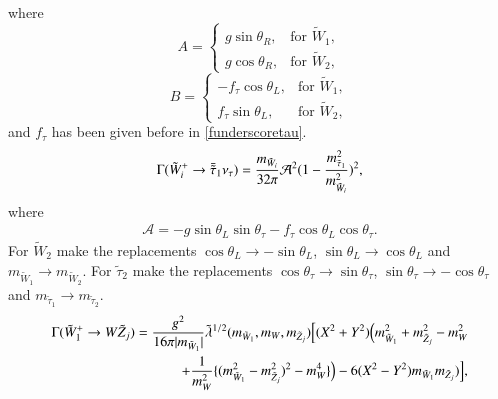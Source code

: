 \documentclass[final,3p,times,pdflatex]{elsarticle}
\begin{document}
where
\begin{equation}
  A=\begin{cases}
    g \sin\theta_{R}, & \text{for $\tilde{W}_1$},\\
    g \cos\theta_{R}, & \text{for $\tilde{W}_2$},
  \end{cases}
\end{equation}
\begin{equation}
  B=\begin{cases}
    -f_{\tau} \cos\theta_{L}, & \text{for $\tilde{W}_1$},\\
    f_{\tau}  \sin\theta_{L}, & \text{for $\tilde{W}_2$},
  \end{cases}
\end{equation}
and $f_\tau$ has been given before in \eqref{funderscoretau}.
\begin{equation}\label{chstau1nutau}
\begin{aligned}
\Gamma (\tilde{W}_i^+ \rightarrow \bar{\tilde{\tau}}_1 \nu_{\tau}) = {m_{\tilde{W}_i} \over 32\pi} \mathcal{A}^2 ( 1 - {m_{\tilde{\tau}_{1}}^2 \over m_{\tilde{W}_{i}}^2})^2 ,
\end{aligned}
\end{equation} 
where
\begin{equation}
\begin{aligned}
\mathcal{A} = -g\sin\theta_L\sin\theta_\tau - f_\tau \cos\theta_L\cos\theta_\tau.
\end{aligned}
\end{equation}
For $\tilde{W}_2$ make the replacements $\cos\theta_L \rightarrow -\sin\theta_L$, $\sin\theta_L \rightarrow \cos\theta_L$ and $m_{\tilde{W}_1} \rightarrow m_{\tilde{W}_2}$.
For $\tilde{\tau}_2$ make the replacements $\cos\theta_\tau \rightarrow \sin\theta_\tau$, $\sin\theta_\tau \rightarrow -\cos\theta_\tau$ and $m_{\tilde{\tau}_1} \rightarrow m_{\tilde{\tau}_2}$.
\begin{equation}\label{ch1Wneut}
\begin{aligned}
\Gamma (\tilde{W}_1^+ \rightarrow W \tilde{Z}_j) = {g^2 \over 16\pi|m_{\tilde{W}_1}| } \tilde{\lambda}^{1/2} (m_{\tilde{W}_1}, m_W, m_{\tilde{Z}_j}) \Big[(X^2 + Y^2)\Big(m_{\tilde{W}_1}^2 + m_{\tilde{Z}_j}^2 - m_{W}^2  \\ +{1 \over m_{W}^2}\{(m_{\tilde{W}_{1}}^2 - m_{\tilde{Z}_{j}}^2)^2 - m_{W}^4\}\Big) - 6(X^2 - Y^2)m_{\tilde{W}_1} m_{\tilde{Z}_j}) \Big] ,
\end{aligned}
\end{equation} 
\end{document}
